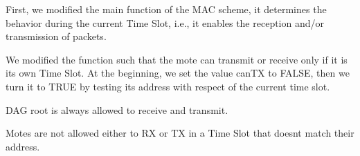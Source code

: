 First, we modified the main function of the M\+AC scheme, it determines the behavior during the current Time Slot, i.\+e., it enables the reception and/or transmission of packets.

We modified the function such that the mote can transmit or receive only if it is its own Time Slot. At the beginning, we set the value can\+TX to F\+A\+L\+SE, then we turn it to T\+R\+UE by testing its address with respect of the current time slot.
\begin{DoxyItemize}
\item D\+AG root is always allowed to receive and transmit.
\item Motes are not allowed either to RX or TX in a Time Slot that doesn\textquotesingle{}t match their address.
\end{DoxyItemize}


